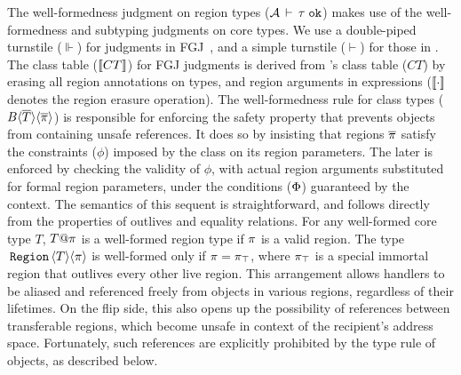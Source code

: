 \noindent The well-formedness judgment on region types
(${\mathcal{A}}\,\vdash\,\tau \; \texttt{ok}$) makes use of the well-formedness and subtyping
judgments on core types. We use a double-piped turnstile ($\Vdash$)
for judgments in FGJ~\cite{fgj}, and a simple turnstile ($\vdash$) for
those in \FB. The class table ($\llbracket CT \rrbracket$) for FGJ judgments is
derived from \FB's class table ($CT$) by erasing all region
annotations on types, and region arguments in expressions
($\llbracket \cdot \rrbracket$ denotes the region erasure operation). 
The well-formedness rule for class types
($B\langle \overline{T} \rangle\langle \overline{\pi} \rangle$) is responsible for enforcing the
safety property that prevents objects from containing unsafe
references. It does so by insisting that regions $\overline{\pi}$ satisfy the
constraints ($\phi$) imposed by the class on its region parameters.
The later is enforced by checking the validity of $\phi$, with actual
region arguments substituted for formal region parameters, under the
conditions ($\Phi$) guaranteed by the context. The semantics of this
sequent is straightforward, and follows directly from the properties
of outlives and equality relations. For any well-formed core type $T$,
$T@\pi$ is a well-formed region type if $\pi$ is a valid region. The
type $\,{\tt Region}\,\langle T \rangle\langle \pi \rangle$ is well-formed only if $\pi = \pi_{\top}$, where
$\pi_{\top}$ is a special immortal region that outlives every other live
region. This arrangement allows \C{\RgnZ} handlers to be aliased and
referenced freely from objects in various regions, regardless of their
lifetimes. On the flip side, this also opens up the possibility of
references between transferable regions, which become unsafe in
context of the recipient's address space. Fortunately, such references
are explicitly prohibited by the type rule of \C{\RgnZ} objects, as
described below.


